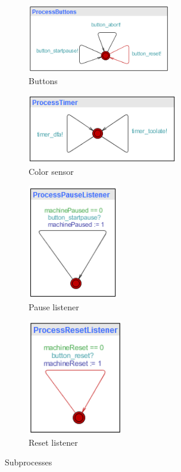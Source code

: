 \documentclass[a4paper,oneside,11pt]{article}
\begin{document}
\begin{figure}
\begin{subfigure}{0.45\textwidth}
\centering
\includegraphics[height=30mm]{processbuttons}
\caption{Buttons}
\end{subfigure}
\hfill
\begin{subfigure}{0.45\textwidth}
\centering
\includegraphics[height=30mm]{processtimer}
\caption{Color sensor}
\end{subfigure}

\begin{subfigure}{0.45\textwidth}
\centering
\includegraphics[height=50mm]{processpauselistener}
\caption{Pause listener}
\end{subfigure}
\hfill
\begin{subfigure}{0.45\textwidth}
\centering
\includegraphics[height=50mm]{processresetlistener}
\caption{Reset listener}
\end{subfigure}
\caption{Subprocesses}
\end{figure}
\end{document}

